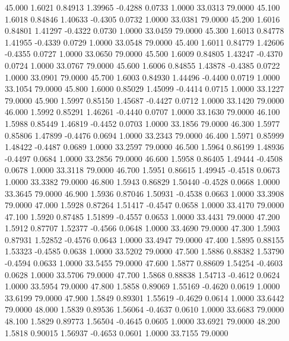   45.000   1.6021   0.84913   1.39965  -0.4288   0.0733   1.0000  33.0313  79.0000
  45.100   1.6018   0.84846   1.40633  -0.4305   0.0732   1.0000  33.0381  79.0000
  45.200   1.6016   0.84801   1.41297  -0.4322   0.0730   1.0000  33.0459  79.0000
  45.300   1.6013   0.84778   1.41955  -0.4339   0.0729   1.0000  33.0548  79.0000
  45.400   1.6011   0.84779   1.42606  -0.4355   0.0727   1.0000  33.0650  79.0000
  45.500   1.6009   0.84805   1.43247  -0.4370   0.0724   1.0000  33.0767  79.0000
  45.600   1.6006   0.84855   1.43878  -0.4385   0.0722   1.0000  33.0901  79.0000
  45.700   1.6003   0.84930   1.44496  -0.4400   0.0719   1.0000  33.1054  79.0000
  45.800   1.6000   0.85029   1.45099  -0.4414   0.0715   1.0000  33.1227  79.0000
  45.900   1.5997   0.85150   1.45687  -0.4427   0.0712   1.0000  33.1420  79.0000
  46.000   1.5992   0.85291   1.46261  -0.4440   0.0707   1.0000  33.1630  79.0000
  46.100   1.5988   0.85449   1.46819  -0.4452   0.0703   1.0000  33.1856  79.0000
  46.300   1.5977   0.85806   1.47899  -0.4476   0.0694   1.0000  33.2343  79.0000
  46.400   1.5971   0.85999   1.48422  -0.4487   0.0689   1.0000  33.2597  79.0000
  46.500   1.5964   0.86199   1.48936  -0.4497   0.0684   1.0000  33.2856  79.0000
  46.600   1.5958   0.86405   1.49444  -0.4508   0.0678   1.0000  33.3118  79.0000
  46.700   1.5951   0.86615   1.49945  -0.4518   0.0673   1.0000  33.3382  79.0000
  46.800   1.5943   0.86829   1.50440  -0.4528   0.0668   1.0000  33.3645  79.0000
  46.900   1.5936   0.87046   1.50931  -0.4538   0.0663   1.0000  33.3908  79.0000
  47.000   1.5928   0.87264   1.51417  -0.4547   0.0658   1.0000  33.4170  79.0000
  47.100   1.5920   0.87485   1.51899  -0.4557   0.0653   1.0000  33.4431  79.0000
  47.200   1.5912   0.87707   1.52377  -0.4566   0.0648   1.0000  33.4690  79.0000
  47.300   1.5903   0.87931   1.52852  -0.4576   0.0643   1.0000  33.4947  79.0000
  47.400   1.5895   0.88155   1.53323  -0.4585   0.0638   1.0000  33.5202  79.0000
  47.500   1.5886   0.88382   1.53790  -0.4594   0.0633   1.0000  33.5455  79.0000
  47.600   1.5877   0.88609   1.54254  -0.4603   0.0628   1.0000  33.5706  79.0000
  47.700   1.5868   0.88838   1.54713  -0.4612   0.0624   1.0000  33.5954  79.0000
  47.800   1.5858   0.89069   1.55169  -0.4620   0.0619   1.0000  33.6199  79.0000
  47.900   1.5849   0.89301   1.55619  -0.4629   0.0614   1.0000  33.6442  79.0000
  48.000   1.5839   0.89536   1.56064  -0.4637   0.0610   1.0000  33.6683  79.0000
  48.100   1.5829   0.89773   1.56504  -0.4645   0.0605   1.0000  33.6921  79.0000
  48.200   1.5818   0.90015   1.56937  -0.4653   0.0601   1.0000  33.7155  79.0000
